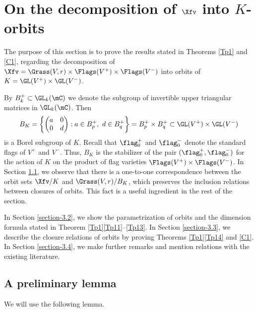 \section{On the decomposition of $\Xfv$ into $K$-orbits}

\label{section-3}

The purpose of this section is to prove the results stated in Theorems \ref{Tp1} and \ref{C1}, regarding the decomposition of $\Xfv=\Grass(V,r)\times\Flags(V^+)\times\Flags(V^-)$ into orbits of $K=\GL(V^+)\times\GL(V^-)$.

By $B_k^+\subset\GL_k(\mC)$ we denote the subgroup of invertible upper triangular matrices in $\GL_k(\mC)$.
Then\[B_K=\left\{\begin{pmatrix}
a & 0\\ 0 & d
\end{pmatrix}:a\in B_p^+,\ d\in B_q^+\right\}=B_p^+\times B_q^+\subset\GL(V^+)\times\GL(V^-)\]
is a Borel subgroup of $K$. Recall that $\flag_0^+$ and $\flag_0^-$ denote the standard flags of $V^+$ and $V^-$. Thus, $B_K$ is the stabilizer of the pair $(\flag_0^+,\flag_0^-)$ for the action of $K$ on the product of flag varieties $\Flags(V^+)\times\Flags(V^-)$.
In Section \ref{section-3.1}, we observe that there is a one-to-one correspondence between the orbit sets $\Xfv/K$ and $\Grass(V,r)/B_K$, which preserves the inclusion relations between closures of orbits. This fact is a useful ingredient in the rest of the section.

In Section \ref{section-3.2}, we show the parametrization of orbits and the dimension formula stated in Theorem \ref{Tp1}\ref{Tp11}--\ref{Tp13}. In Section \ref{section-3.3}, we describe the closure relations of orbits
by proving Theorems \ref{Tp1}\ref{Tp14} and \ref{C1}.
In Section \ref{section-3.4}, we make further remarks and mention relations with the existing literature.


\subsection{A preliminary lemma}

\label{section-3.1}

We will use the following lemma.


